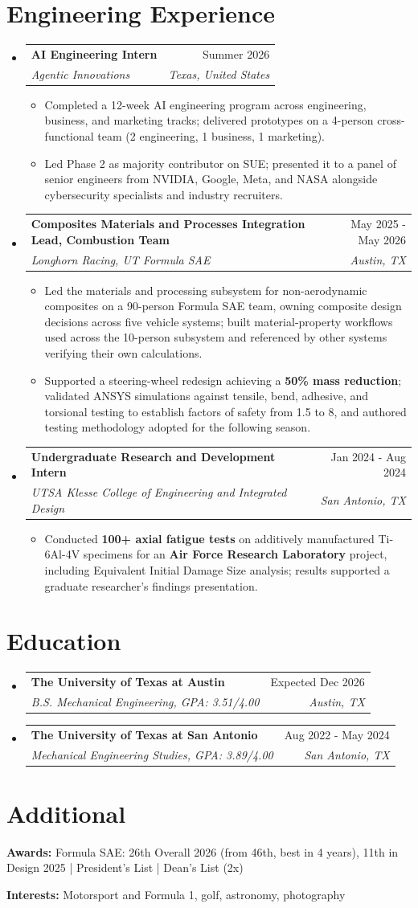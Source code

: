\documentclass[letterpaper,10pt]{article}
\makeatletter
\newcommand{\resumeItem}[1]{\item\small{#1}}
\newcommand{\resumeHeading}[4]{
  \item
  \begin{tabularx}{\textwidth}{@{}Xr@{}}
    \textbf{#1} & #2 \\
    \textit{\small #3} & \textit{\small #4} \\
  \end{tabularx}\vspace{-3pt}
}
\makeatother
\begin{document}
\section{Engineering Experience}
\begin{itemize}[leftmargin=0in, label={}]
  \resumeHeading{AI Engineering Intern}{Summer 2026}{Agentic Innovations}{Texas, United States}
  \begin{itemize}
    \resumeItem{Completed a 12-week AI engineering program across engineering, business, and marketing tracks; delivered prototypes on a 4-person cross-functional team (2 engineering, 1 business, 1 marketing).}
    \resumeItem{Led Phase 2 as majority contributor on SUE; presented it to a panel of senior engineers from NVIDIA, Google, Meta, and NASA alongside cybersecurity specialists and industry recruiters.}
  \end{itemize}

  \resumeHeading{Composites Materials and Processes Integration Lead, Combustion Team}{May 2025 - May 2026}{Longhorn Racing, UT Formula SAE}{Austin, TX}
  \begin{itemize}
    \resumeItem{Led the materials and processing subsystem for non-aerodynamic composites on a 90-person Formula SAE team, owning composite design decisions across five vehicle systems; built material-property workflows used across the 10-person subsystem and referenced by other systems verifying their own calculations.}
    \resumeItem{Supported a steering-wheel redesign achieving a \textbf{50\% mass reduction}; validated ANSYS simulations against tensile, bend, adhesive, and torsional testing to establish factors of safety from 1.5 to 8, and authored testing methodology adopted for the following season.}
  \end{itemize}

  \resumeHeading{Undergraduate Research and Development Intern}{Jan 2024 - Aug 2024}{UTSA Klesse College of Engineering and Integrated Design}{San Antonio, TX}
  \begin{itemize}
    \resumeItem{Conducted \textbf{100+ axial fatigue tests} on additively manufactured Ti-6Al-4V specimens for an \textbf{Air Force Research Laboratory} project, including Equivalent Initial Damage Size analysis; results supported a graduate researcher's findings presentation.}
  \end{itemize}
\end{itemize}

\section{Education}
\begin{itemize}[leftmargin=0in, label={}]
  \resumeHeading{The University of Texas at Austin}{Expected Dec 2026}{B.S. Mechanical Engineering, GPA: 3.51/4.00}{Austin, TX}
  \resumeHeading{The University of Texas at San Antonio}{Aug 2022 - May 2024}{Mechanical Engineering Studies, GPA: 3.89/4.00}{San Antonio, TX}
\end{itemize}

\section{Additional}
\noindent\small \textbf{Awards:} Formula SAE: 26th Overall 2026 (from 46th, best in 4 years), 11th in Design 2025 \;|\; President's List \;|\; Dean's List (2x)\par
\noindent\small \textbf{Interests:} Motorsport and Formula 1, golf, astronomy, photography
\end{document}
